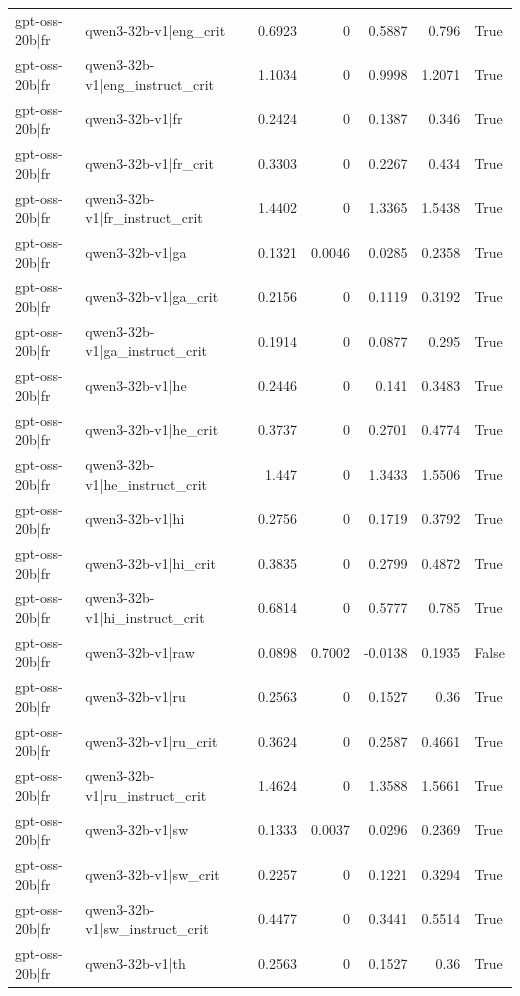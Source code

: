 \begin{table}
\begin{tabular}{l l r r r r l}
gpt-oss-20b|fr & qwen3-32b-v1|eng_crit & 0.6923 & 0 & 0.5887 & 0.796 & True \\
gpt-oss-20b|fr & qwen3-32b-v1|eng_instruct_crit & 1.1034 & 0 & 0.9998 & 1.2071 & True \\
gpt-oss-20b|fr & qwen3-32b-v1|fr & 0.2424 & 0 & 0.1387 & 0.346 & True \\
gpt-oss-20b|fr & qwen3-32b-v1|fr_crit & 0.3303 & 0 & 0.2267 & 0.434 & True \\
gpt-oss-20b|fr & qwen3-32b-v1|fr_instruct_crit & 1.4402 & 0 & 1.3365 & 1.5438 & True \\
gpt-oss-20b|fr & qwen3-32b-v1|ga & 0.1321 & 0.0046 & 0.0285 & 0.2358 & True \\
gpt-oss-20b|fr & qwen3-32b-v1|ga_crit & 0.2156 & 0 & 0.1119 & 0.3192 & True \\
gpt-oss-20b|fr & qwen3-32b-v1|ga_instruct_crit & 0.1914 & 0 & 0.0877 & 0.295 & True \\
gpt-oss-20b|fr & qwen3-32b-v1|he & 0.2446 & 0 & 0.141 & 0.3483 & True \\
gpt-oss-20b|fr & qwen3-32b-v1|he_crit & 0.3737 & 0 & 0.2701 & 0.4774 & True \\
gpt-oss-20b|fr & qwen3-32b-v1|he_instruct_crit & 1.447 & 0 & 1.3433 & 1.5506 & True \\
gpt-oss-20b|fr & qwen3-32b-v1|hi & 0.2756 & 0 & 0.1719 & 0.3792 & True \\
gpt-oss-20b|fr & qwen3-32b-v1|hi_crit & 0.3835 & 0 & 0.2799 & 0.4872 & True \\
gpt-oss-20b|fr & qwen3-32b-v1|hi_instruct_crit & 0.6814 & 0 & 0.5777 & 0.785 & True \\
gpt-oss-20b|fr & qwen3-32b-v1|raw & 0.0898 & 0.7002 & -0.0138 & 0.1935 & False \\
gpt-oss-20b|fr & qwen3-32b-v1|ru & 0.2563 & 0 & 0.1527 & 0.36 & True \\
gpt-oss-20b|fr & qwen3-32b-v1|ru_crit & 0.3624 & 0 & 0.2587 & 0.4661 & True \\
gpt-oss-20b|fr & qwen3-32b-v1|ru_instruct_crit & 1.4624 & 0 & 1.3588 & 1.5661 & True \\
gpt-oss-20b|fr & qwen3-32b-v1|sw & 0.1333 & 0.0037 & 0.0296 & 0.2369 & True \\
gpt-oss-20b|fr & qwen3-32b-v1|sw_crit & 0.2257 & 0 & 0.1221 & 0.3294 & True \\
gpt-oss-20b|fr & qwen3-32b-v1|sw_instruct_crit & 0.4477 & 0 & 0.3441 & 0.5514 & True \\
gpt-oss-20b|fr & qwen3-32b-v1|th & 0.2563 & 0 & 0.1527 & 0.36 & True \\

\end{tabular}
\end{table}
